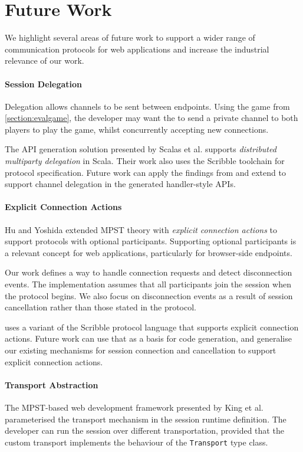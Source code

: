 \section{Future Work}
\label{section:future}

We highlight several areas of future work
to support a wider range of communication protocols
for web applications and increase the 
industrial relevance of our work.

\paragraph{Session Delegation}
Delegation allows channels to be sent between endpoints.
Using the  game
from \cref{section:evalgame}, the developer
may want the  to send a private channel
to both players to play the game,
whilst concurrently accepting new connections.

The API generation solution 
presented by Scalas et al. \cite{LinearDecomp} supports
\textit{distributed multiparty delegation} in Scala.
Their work also uses the Scribble toolchain
for protocol specification.
Future work can apply the findings from \cite{LinearDecomp}
and extend \codegen to support channel delegation
in the generated handler-style APIs.

\paragraph{Explicit Connection Actions}
Hu and Yoshida \cite{ExplicitConnections} extended 
MPST theory
with \textit{explicit connection actions} to support protocols 
with optional participants.
Supporting optional participants is a relevant concept
for web applications, particularly for browser-side endpoints.

Our work defines a way to handle connection requests
and detect disconnection events. The implementation assumes that
all participants join the session when the protocol begins.
We also focus on disconnection events as a result of session
cancellation rather than those stated in the protocol.

\cite{ExplicitConnections} uses a variant of the Scribble protocol
language that supports explicit connection actions. Future work
can use that as a basis for code generation, and generalise
our existing mechanisms for session connection and cancellation
to support explicit connection actions.

\paragraph{Transport Abstraction}
The MPST-based web development framework presented by 
King et al. \cite{PureScript2019} parameterised
the transport mechanism in the session runtime definition.
The developer can run the session over different transportation,
provided that the custom transport implements the behaviour
of the \texttt{Transport} type class.

